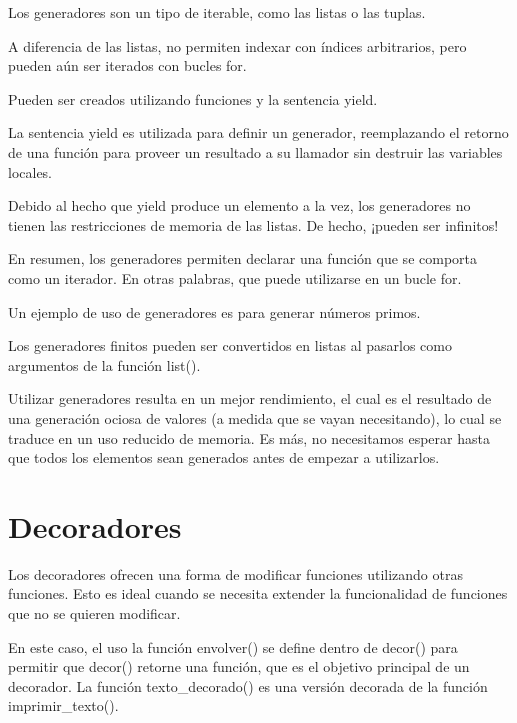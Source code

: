 \documentclass{report}
\begin{document}
Los generadores son un tipo de iterable, como las listas o las tuplas.\smallskip

A diferencia de las listas, no permiten indexar con índices arbitrarios, pero pueden aún ser iterados con bucles for.\smallskip

Pueden ser creados utilizando funciones y la sentencia yield.



La sentencia yield es utilizada para definir un generador, reemplazando el retorno de una función para proveer un resultado a su llamador sin destruir las variables locales.\smallskip

Debido al hecho que yield produce un elemento a la vez, los generadores no tienen las restricciones de memoria de las listas. De hecho, ¡pueden ser infinitos!


En resumen, los generadores permiten declarar una función que se comporta como un iterador. En otras palabras, que puede utilizarse en un bucle for.\smallskip

Un ejemplo de uso de generadores es para generar números primos.


Los generadores finitos pueden ser convertidos en listas al pasarlos como argumentos de la función list().


Utilizar generadores resulta en un mejor rendimiento, el cual es el resultado de una generación ociosa de valores (a medida que se vayan necesitando), lo cual se traduce en un uso reducido de memoria. Es más, no necesitamos esperar hasta que todos los elementos sean generados antes de empezar a utilizarlos.

\section{Decoradores}

Los decoradores ofrecen una forma de modificar funciones utilizando otras funciones. Esto es ideal cuando se necesita extender la funcionalidad de funciones que no se quieren modificar.


En este caso, el uso la función envolver() se define dentro de decor() para permitir que decor() retorne una función, que es el objetivo principal de un decorador. La función texto\_decorado() es una versión decorada de la función imprimir\_texto().\smallskip
\end{document}
